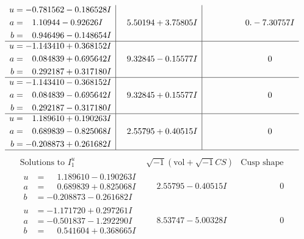\documentclass[1p]{elsarticle_modified}
\theoremstyle{definition}
\newcommand{\I}{\sqrt{-1}}
\begin{document}
$$\begin{array}{c|c|c}
\begin{aligned}
u &= -0.781562 - 0.186528 I \\
a &= \phantom{-}1.10944 - 0.92626 I \\
b &= \phantom{-}0.946496 - 0.148654 I\end{aligned}
 & \phantom{-}5.50194 + 3.75805 I & \phantom{-0.000000 } 0. - 7.30757 I \\ \hline\begin{aligned}
u &= -1.143410 + 0.368152 I \\
a &= \phantom{-}0.084839 + 0.695642 I \\
b &= \phantom{-}0.292187 + 0.317180 I\end{aligned}
 & \phantom{-}9.32845 - 0.15577 I & \phantom{-0.000000 } 0 \\ \hline\begin{aligned}
u &= -1.143410 - 0.368152 I \\
a &= \phantom{-}0.084839 - 0.695642 I \\
b &= \phantom{-}0.292187 - 0.317180 I\end{aligned}
 & \phantom{-}9.32845 + 0.15577 I & \phantom{-0.000000 } 0 \\ \hline\begin{aligned}
u &= \phantom{-}1.189610 + 0.190263 I \\
a &= \phantom{-}0.689839 - 0.825068 I \\
b &= -0.208873 + 0.261682 I\end{aligned}
 & \phantom{-}2.55795 + 0.40515 I & \phantom{-0.000000 } 0\\
 \hline 
 \end{array}$$\newpage$$\begin{array}{c|c|c}  
\text{Solutions to }I^u_{1}& \I (\text{vol} + \sqrt{-1}CS) & \text{Cusp shape}\\
 \hline 
\begin{aligned}
u &= \phantom{-}1.189610 - 0.190263 I \\
a &= \phantom{-}0.689839 + 0.825068 I \\
b &= -0.208873 - 0.261682 I\end{aligned}
 & \phantom{-}2.55795 - 0.40515 I & \phantom{-0.000000 } 0 \\ \hline\begin{aligned}
u &= -1.171720 + 0.297261 I \\
a &= -0.501837 - 1.292290 I \\
b &= \phantom{-}0.541604 + 0.368665 I\end{aligned}
 & \phantom{-}8.53747 - 5.00328 I & \phantom{-0.000000 } 0 \\ \hline\begin{aligned}

\end{aligned}
\end{array}$$
\end{document}
